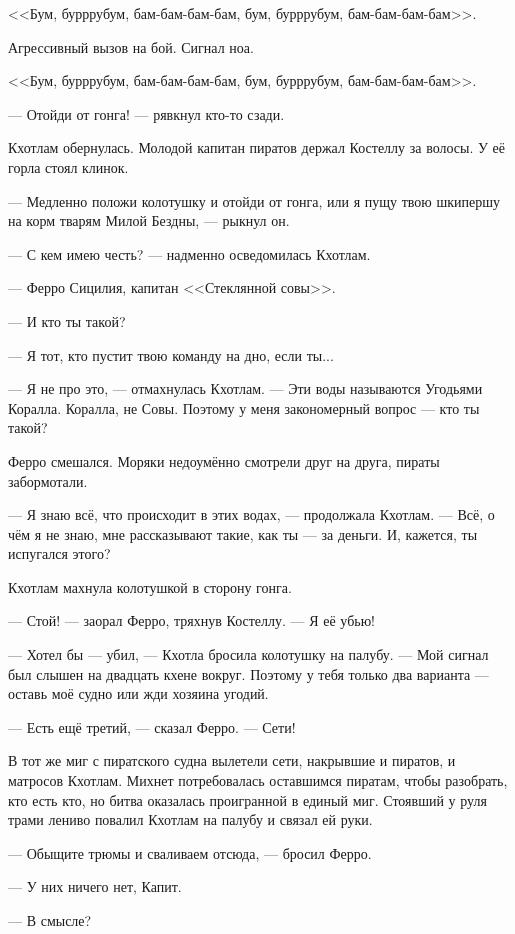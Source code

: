 <<Бум, бурррубум, бам-бам-бам-бам, бум, бурррубум, бам-бам-бам-бам>>.

Агрессивный вызов на бой.
Сигнал ноа.

<<Бум, бурррубум, бам-бам-бам-бам, бум, бурррубум, бам-бам-бам-бам>>.

--- Отойди от гонга! --- рявкнул кто-то сзади.

Кхотлам обернулась.
Молодой капитан пиратов держал Костеллу за волосы.
У её горла стоял клинок.

--- Медленно положи колотушку и отойди от гонга, или я пущу твою шкипершу на корм тварям Милой Бездны, --- рыкнул он.

--- С кем имею честь? --- надменно осведомилась Кхотлам.

--- Ферро Сицилия, капитан <<Стеклянной совы>>.

--- И кто ты такой?

--- Я тот, кто пустит твою команду на дно, если ты...

--- Я не про это, --- отмахнулась Кхотлам.
--- Эти воды называются Угодьями Коралла.
Коралла, не Совы.
Поэтому у меня закономерный вопрос --- кто ты такой?

Ферро смешался.
Моряки недоумённо смотрели друг на друга, пираты забормотали.

--- Я знаю всё, что происходит в этих водах, --- продолжала Кхотлам.
--- Всё, о чём я не знаю, мне рассказывают такие, как ты --- за деньги.
И, кажется, ты испугался этого?

Кхотлам махнула колотушкой в сторону гонга.

--- Стой! --- заорал Ферро, тряхнув Костеллу.
--- Я её убью!

--- Хотел бы --- убил, --- Кхотла бросила колотушку на палубу.
--- Мой сигнал был слышен на двадцать кхене вокруг.
Поэтому у тебя только два варианта --- оставь моё судно или жди хозяина угодий.

--- Есть ещё третий, --- сказал Ферро.
--- Сети!

В тот же миг с пиратского судна вылетели сети, накрывшие и пиратов, и матросов Кхотлам.
Михнет потребовалась оставшимся пиратам, чтобы разобрать, кто есть кто, но битва оказалась проигранной в единый миг.
Стоявший у руля трами лениво повалил Кхотлам на палубу и связал ей руки.

--- Обыщите трюмы и сваливаем отсюда, --- бросил Ферро.

--- У них ничего нет, Капит.

--- В смысле?

